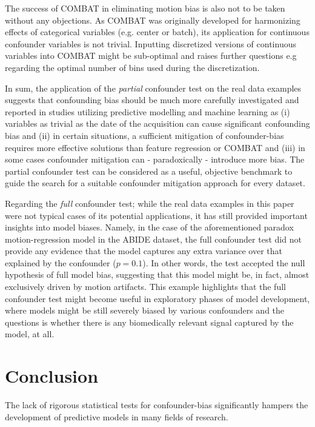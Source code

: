 \documentclass{article}
\begin{document}
 The success of COMBAT in eliminating motion bias is also not to be taken without any objections. As COMBAT was originally developed for harmonizing effects of categorical variables (e.g. center or batch), its application for continuous confounder variables is not trivial. Inputting discretized versions of continuous variables into COMBAT might be sub-optimal and raises further questions e.g regarding the optimal number of bins used during the discretization.
 
 In sum, the application of the \emph{partial} confounder test on the real data examples suggests that confounding bias should be much more carefully investigated and reported in studies utilizing predictive modelling and machine learning as (i) variables as trivial as the date of the acquisition can cause significant confounding bias and (ii) in certain situations, a sufficient mitigation of confounder-bias requires more effective solutions than feature regression or COMBAT and (iii) in some cases confounder mitigation can - paradoxically - introduce more bias. The partial confounder test can be considered as a useful, objective benchmark to guide the search for a suitable confounder mitigation approach for every dataset.
 
 Regarding the \emph{full} confounder test; while the real data examples in this paper were not typical cases of its potential applications, it has still provided important insights into model biases. Namely, in the case of the aforementioned paradox motion-regression model in the ABIDE dataset, the full confounder test did not provide any evidence that the model captures any extra variance over that explained by the confounder ($p=0.1$). In other words, the test accepted the null hypothesis of full model bias, suggesting that this model might be, in fact, almost exclusively driven by motion artifacts.
This example highlights that the full confounder test might become useful in exploratory phases of model development, where models might be still severely biased by various confounders and the questions is whether there is any biomedically relevant signal captured by the model, at all.


\section{Conclusion}

The lack of rigorous statistical tests for confounder-bias significantly hampers the development of predictive models in many fields of research.
\end{document}
